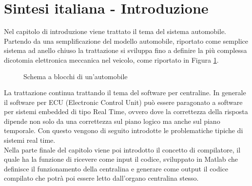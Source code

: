\documentclass[../main.tex]{subfiles}
\begin{document}
\section{Sintesi italiana - Introduzione}
Nel capitolo di introduzione viene trattato il tema del sistema automobile. Partendo da una semplificazione del modello automobile, riportato come semplice sistema ad anello chiuso la trattazione si sviluppa fino a definire la più complessa dicotomia elettronica meccanica nel veicolo, come riportato in Figura \ref{fig:schemaablocchi}.
\begin{figure}[ht]
        \begin{center}
        \end{center}
        \caption{Schema a blocchi di un'automobile}
        \label{fig:schemaablocchi}
    \end{figure}
La trattazione continua trattando il tema del software per centraline. In generale il software per \gls{ECU} (Electronic Control Unit) può essere paragonato a software per sistemi embedded di tipo Real Time, ovvero dove la correttezza della risposta dipende non solo da una correttezza sul piano logico ma anche sul piano temporale. Con questo vengono di seguito introdotte le problematiche tipiche di sistemi real time.\\
Nella parte finale del capitolo viene poi introdotto il concetto di compilatore, il quale ha la funzione di ricevere come input il codice, sviluppato in Matlab che definisce il funzionamento della centralina e generare come output il codice compilato che potrà poi essere letto dall'organo centralina stesso.\\
\end{document}
